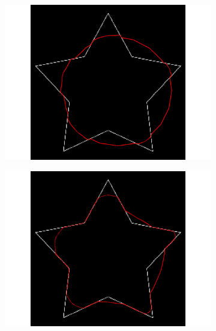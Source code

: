 \begin{figure}[H]
\begin{subfigure}[c]{0.3\linewidth}
\centering
\includegraphics[width=\textwidth]{Chapters/Images/Init/vfccl1}
\caption{}
\end{subfigure}
\begin{subfigure}[c]{0.3\linewidth}
\centering
\includegraphics[width=\textwidth]{Chapters/Images/Init/vfccl2}
\caption{}
\end{subfigure}
\begin{subfigure}[c]{0.3\linewidth}
\centering

\end{subfigure}
\end{figure}
